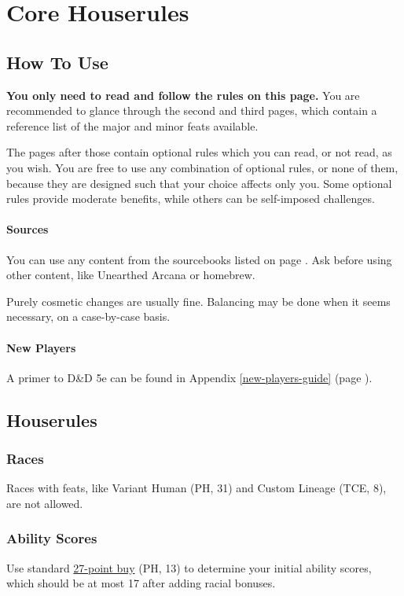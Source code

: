 \documentclass[letterpaper,twocolumn,openany,nodeprecatedcode,bg=print]{dndbook}
\newcommand{\pg}[1]{page \pageref{#1}}
\begin{document}




\chapter{Core Houserules}

\noindent [Version 8.1.1]

\section{How To Use}
\textbf{You only need to read and follow the rules on this page.} You are recommended to glance through the second and third pages, which contain a reference list of the major and minor feats available.

The pages after those contain optional rules which you can read, or not read, as you wish.
You are free to use any combination of optional rules, or none of them, because they are designed such that your choice affects only you.
Some optional rules provide moderate benefits, while others can be self-imposed challenges. 

\subsubsection{Sources}
You can use any content from the sourcebooks listed on \pg{sources}. 
Ask before using other content, like Unearthed Arcana or homebrew. 

Purely cosmetic changes are usually fine. Balancing may be done when it seems necessary, on a case-by-case basis. 

\subsubsection{New Players}
A primer to D\&D 5e can be found in Appendix \ref{new-players-guide} (\pg{new-players-guide}).

\newpage
\section{Houserules}

\subsection{Races}
Races with feats, like Variant Human (PH, 31) and Custom Lineage (TCE, 8), are not allowed.

\subsection{Ability Scores}
Use standard \href{https://chicken-dinner.com/5e/5e-point-buy.html}{27-point buy} (PH, 13) to determine your initial ability scores, which should be at most 17 after adding racial bonuses.
\end{document}
